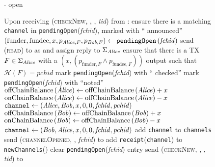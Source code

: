 \begin{figure}[H]
\begin{systembox}{\fpaynet - open}
\begin{algorithmic}[1]
        \State Upon receiving (\textsc{checkNew}, \alice, \bob, \textit{tid})
        from \alice:
        \Indent
            \State ensure there is a matching \texttt{channel} in
            \texttt{pendingOpen}(\textit{fchid}), marked with ``\alice{}
            announced''
            \State $\left(\mathrm{funder}, \mathrm{fundee}, x, p_{\mathit{Alice}, F},
            p_{\mathit{Bob}, F}\right) \gets
            \mathtt{pendingOpen}\left(\mathit{fchid}\right)$
            \State send (\textsc{read}) to \ledger{} as \alice{} and assign reply
            to $\Sigma_{\mathit{Alice}}$
            \State ensure that there is a TX $F \in \Sigma_{\mathit{Alice}}$ with a
            $\left(x, \left(p_{\mathrm{funder}, F} \wedge p_{\mathrm{fundee},
            F}\right)\right)$ output such that $\mathcal{H}\left(F\right) =
            \mathit{pchid}$
            \State mark \texttt{pendingOpen}(\textit{fchid}) with ``\alice{}
            checked''
              \State mark \texttt{pendingOpen}(\textit{fchid}) with ``noted''
                \State $\mathrm{offChainBalance}\left(\mathit{Alice}\right) \gets
                \mathrm{offChainBalance}\left(\mathit{Alice}\right) + x$ 
                \State $\mathrm{onChainBalance}\left(\mathit{Alice}\right) \gets
                \mathrm{offChainBalance}\left(\mathit{Alice}\right) - x$
                \State $\mathtt{channel} \gets \left(\mathit{Alice}, \mathit{Bob}, x, 0, 0,
                \mathit{fchid}, \mathit{pchid}\right)$
              \Else {}
                \State $\mathrm{offChainBalance}\left(\mathit{Bob}\right) \gets
                \mathrm{offChainBalance}\left(\mathit{Bob}\right) + x$ 
                \State $\mathrm{onChainBalance}\left(\mathit{Bob}\right) \gets
                \mathrm{offChainBalance}\left(\mathit{Bob}\right) - x$
                \State $\mathtt{channel} \gets \left(\mathit{Bob}, \mathit{Alice}, x, 0, 0,
                \mathit{fchid}, \mathit{pchid}\right)$
              \EndIf
              \State add \texttt{channel} to \texttt{channels}
            \EndIf
            \State send (\textsc{channelOpened}, \alice, \textit{fchid}) to
            \simulator
            \State add \texttt{receipt}(\texttt{channel}) to
            \texttt{newChannels}(\alice)
              \State clear \texttt{pendingOpen}(\textit{fchid}) entry
            \EndIf
          \Else {}
            \State send (\textsc{checkNew}, \alice, \bob, \textit{tid}) to
            \simulator
          \EndIf
        \EndIndent
      \end{algorithmic}
    \end{systembox}
    \caption{}
    \label{alg:fpaynet:open}
  \end{figure}

